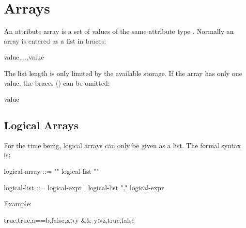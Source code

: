 
\section{Arrays}
\label{sec:anarray}
An attribute array is a set of values of the same
{attribute type} .
Normally an array is entered as a list in braces:
\begin{example}
{value,...,value}
\end{example}
The list length is only limited by the available storage.
If the array has only one value, the braces (\texttt{{}}) can be omitted:
\begin{example}
value
\end{example}

\subsection{Logical Arrays}
\label{sec:logarray}
For the time being, logical arrays can only be given as a list.
The formal syntax is:
\begin{example}
logical-array ::= "{" logical-list "}"

logical-list  ::= logical-expr |
                  logical-list "," logical-expr
\end{example}
\par
\noindent Example:
\begin{example}
{true,true,a==b,false,x>y && y>z,true,false}
\end{example}


